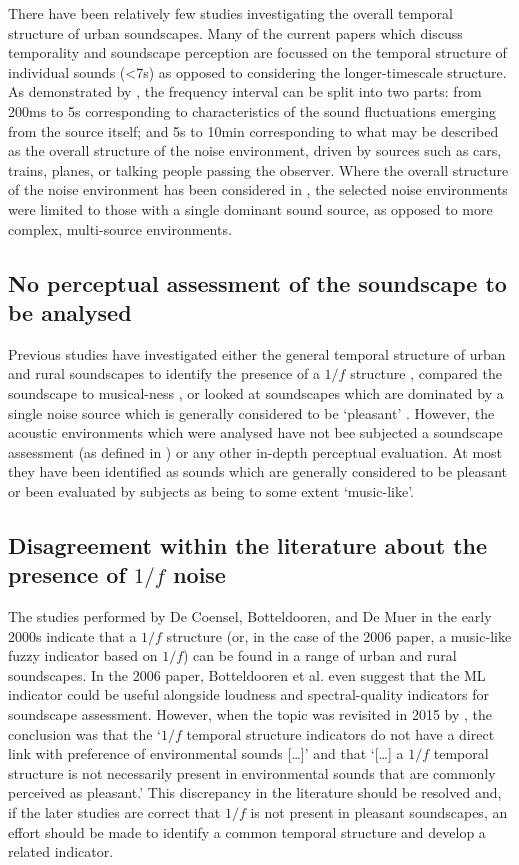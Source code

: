 There have been relatively few studies investigating the overall temporal structure of urban soundscapes. Many of the current papers which discuss temporality and soundscape perception are focussed on the temporal structure of individual sounds (<7s) as opposed to considering the longer-timescale structure. As demonstrated by \citet{deCoensel20031f}, the frequency interval can be split into two parts: from 200ms to 5s corresponding to characteristics of the sound fluctuations emerging from the source itself; and 5s to 10min corresponding to what may be described as the overall structure of the noise environment, driven by sources such as cars, trains, planes, or talking people passing the observer. Where the overall structure of the noise environment has been considered in \citet{Yang2015Presence}, the selected noise environments were limited to those with a single dominant sound source, as opposed to more complex, multi-source environments.

\subsection{No perceptual assessment of the soundscape to be analysed}
Previous studies have investigated either the general temporal structure of urban and rural soundscapes to identify the presence of a $1/f$ structure \citep{deCoensel20031f}, compared the soundscape to musical-ness \citep{Botteldooren2006temporal}, or looked at soundscapes which are dominated by a single noise source which is generally considered to be `pleasant' \citep{Yang2015Presence}. However, the acoustic environments which were analysed have not bee subjected a soundscape assessment (as defined in \citet{ISO12913Part2}) or any other in-depth perceptual evaluation. At most they have been identified as sounds which are generally considered to be pleasant or been evaluated by subjects as being to some extent `music-like'.

\subsection{Disagreement within the literature about the presence of $1/f$ noise}

The studies performed by De Coensel, Botteldooren, and De Muer in the early 2000s indicate that a $1/f$ structure (or, in the case of the 2006 paper, a music-like fuzzy indicator based on $1/f$) can be found in a range of urban and rural soundscapes. In the 2006 paper, Botteldooren et al. even suggest that the ML indicator could be useful alongside loudness and spectral-quality indicators for soundscape assessment. However, when the topic was revisited in 2015 by \citet{Yang2015Presence}, the conclusion was that the `$1/f$ temporal structure indicators do not have a direct link with preference of environmental sounds [\ldots]' and that `[\ldots] a $1/f$ temporal structure is not necessarily present in environmental sounds that are commonly perceived as pleasant.' This discrepancy in the literature should be resolved and, if the later studies are correct that $1/f$ is not present in pleasant soundscapes, an effort should be made to identify a common temporal structure and develop a related indicator.

